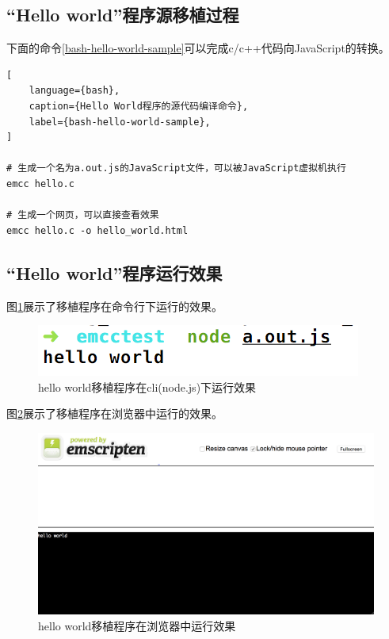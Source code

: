 \subsection{“Hello world”程序源移植过程}

下面的命令\ref{bash-hello-world-sample}可以完成c/c++代码向JavaScript的转换。

\begin{lstlisting}[
    language={bash},
    caption={Hello World程序的源代码编译命令},
    label={bash-hello-world-sample},
]

# 生成一个名为a.out.js的JavaScript文件，可以被JavaScript虚拟机执行
emcc hello.c

# 生成一个网页，可以直接查看效果
emcc hello.c -o hello_world.html
\end{lstlisting}

\subsection{“Hello world”程序运行效果}

图\ref{hello-world-sample-cli}展示了移植程序在命令行下运行的效果。

\begin{figure}[h!] %
    \centering
    \includegraphics[width=200bp]{figure/pic/hello-world-sample-cli.png}
    \caption{hello world移植程序在cli(node.js)下运行效果}
    \label{hello-world-sample-cli}
\end{figure}

图\ref{hello-world-sample-html}展示了移植程序在浏览器中运行的效果。

\begin{figure}[h!] %
    \centering
    \includegraphics[width=400bp]{figure/pic/hello-world-sample-html.png}
    \caption{hello world移植程序在浏览器中运行效果}
    \label{hello-world-sample-html}
\end{figure}


